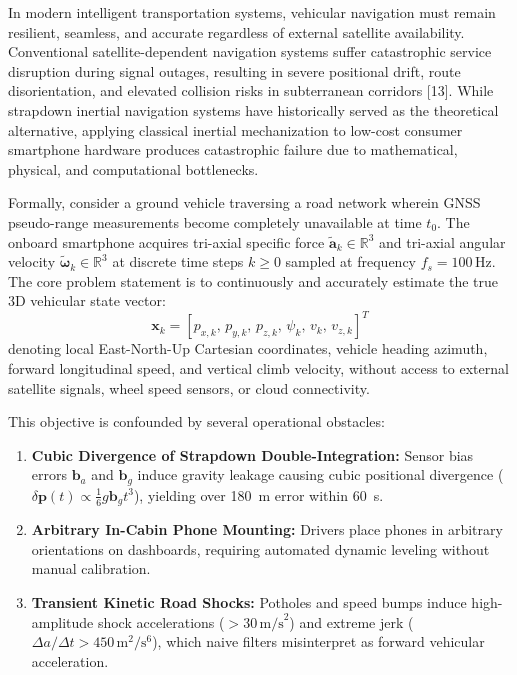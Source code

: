 \documentclass[11pt,a4paper]{article}
\begin{document}
In modern intelligent transportation systems, vehicular navigation must remain resilient, seamless, and accurate regardless of external satellite availability. Conventional satellite-dependent navigation systems suffer catastrophic service disruption during signal outages, resulting in severe positional drift, route disorientation, and elevated collision risks in subterranean corridors [13]. While strapdown inertial navigation systems have historically served as the theoretical alternative, applying classical inertial mechanization to low-cost consumer smartphone hardware produces catastrophic failure due to mathematical, physical, and computational bottlenecks.

Formally, consider a ground vehicle traversing a road network wherein GNSS pseudo-range measurements become completely unavailable at time $t_0$. The onboard smartphone acquires tri-axial specific force $\tilde{\mathbf{a}}_k \in \mathbb{R}^3$ and tri-axial angular velocity $\tilde{\boldsymbol{\omega}}_k \in \mathbb{R}^3$ at discrete time steps $k \ge 0$ sampled at frequency $f_s = 100\,\text{Hz}$. The core problem statement is to continuously and accurately estimate the true 3D vehicular state vector:
\begin{equation}
\mathbf{x}_k = \left[ p_{x,k}, \, p_{y,k}, \, p_{z,k}, \, \psi_k, \, v_k, \, v_{z,k} \right]^T
\end{equation}
denoting local East-North-Up Cartesian coordinates, vehicle heading azimuth, forward longitudinal speed, and vertical climb velocity, without access to external satellite signals, wheel speed sensors, or cloud connectivity.

This objective is confounded by several operational obstacles:
\begin{enumerate}[label=(\alph*),leftmargin=0.7cm,itemsep=1.5pt]
\item \textbf{Cubic Divergence of Strapdown Double-Integration:} Sensor bias errors $\mathbf{b}_a$ and $\mathbf{b}_g$ induce gravity leakage causing cubic positional divergence ($\delta\mathbf{p}(t) \propto \frac{1}{6} g \mathbf{b}_g t^3$), yielding over 180~m error within 60~s.
\item \textbf{Arbitrary In-Cabin Phone Mounting:} Drivers place phones in arbitrary orientations on dashboards, requiring automated dynamic leveling without manual calibration.
\item \textbf{Transient Kinetic Road Shocks:} Potholes and speed bumps induce high-amplitude shock accelerations ($>30\,\text{m/s}^2$) and extreme jerk ($\Delta a / \Delta t > 450\,\text{m}^2/\text{s}^6$), which naive filters misinterpret as forward vehicular acceleration.
\end{enumerate}
\newpage
\end{document}
